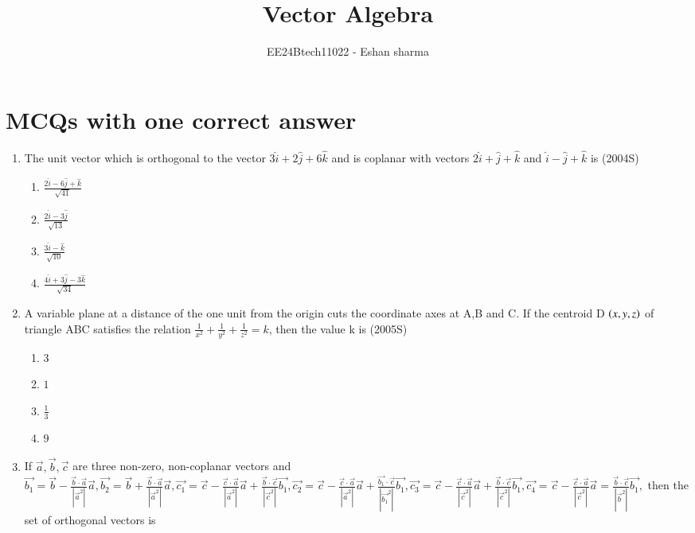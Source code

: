 \documentclass[journal,12pt,twocolumn]{IEEEtran}
\theoremstyle{remark}
\begin{document}

\vspace{3cm}

\title{Vector Algebra}
\author{EE24Btech11022 - Eshan sharma}
\maketitle
\newpage
\bigskip

\renewcommand{\thefigure}{\theenumi}
\renewcommand{\thetable}{\theenumi}


\section{MCQs with one correct answer}
\begin{enumerate}
    \item The unit vector which is orthogonal to the vector $3\hat{i} + 2\hat{j} + 6\hat{k}$ and is coplanar with vectors $2\hat{i} + \hat{j} + \hat{k}$ and $\hat{i} - \hat{j} + \hat{k}$ is 
    \hfill{(2004S)}
    \begin{enumerate}[label=(\alph*)]
    \item $\frac{2\hat{i} - 6\hat{j} + \hat{k}}{\sqrt{41}}$
    \item $\frac{2\hat{i} - 3\hat{j}}{\sqrt{13}}$
    \item $\frac{3\hat{i} - \hat{k}}{\sqrt{10}}$
    \item $\frac{4\hat{i} + 3\hat{j} - 3\hat{k}}{\sqrt{34}}$
    \end{enumerate}
    \item A variable plane at a distance of the one unit from the origin cuts the coordinate axes at A,B and C. If the centroid D $\left(x,y,z\right)$ of triangle ABC satisfies the relation $\frac{1}{x^{2}} + \frac{1}{y^{2}} + \frac{1}{z^{2}} = k$, then the value k is
    \hfill{(2005S)}
    \begin{enumerate}[label=(\alph*)]
    \item $3$
    \item $1$
    \item $\frac{1}{3}$
    \item $9$
    \end{enumerate}
    \item If $\vec{a} ,\vec{b} ,\vec{c}$ are three non-zero, non-coplanar vectors and $\vec{b_1} = \vec{b} - \frac{\vec{b} \cdot \vec{a}}{|\vec{a}^2|} \vec{a} , \vec{b_2} = \vec{b} + \frac{\vec{b} \cdot \vec{a}}{|\vec{a}^2|} \vec{a}, \vec{c_1} = \vec{c} - \frac{\vec{c} \cdot \vec{a}}{|\vec{a}^2|} \vec{a} + \frac{\vec{b} \cdot \vec{c}}{|\vec{c}^2|} \vec{b_1}, \vec{c_2} = \vec{c} - \frac{\vec{c} \cdot \vec{a}}{|\vec{a}^2|} \vec{a} + \frac{\vec{b_1} \cdot \vec{c}}{|\vec{b_1}^2|} \vec{b_1}, \vec{c_3} = \vec{c} - \frac{\vec{c} \cdot \vec{a}}{|\vec{c}^2|} \vec{a} + \frac{\vec{b} \cdot \vec{c}}{|\vec{c}^2|} \vec{b_1}, \vec{c_4} = \vec{c} - \frac{\vec{c} \cdot \vec{a}}{|\vec{c}^2|} \vec{a} = \frac{\vec{b} \cdot \vec{c}}{|\vec{b}^2|} \vec{b_1},$ then the set of orthogonal vectors is 

\end{enumerate}
\end{document}
